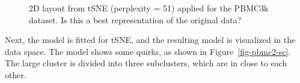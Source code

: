 \documentclass[
  12pt]{article}
\begin{document}
\begin{figure}[H]


\caption{\label{fig-tsnesuggest}2D layout from tSNE (perplexity = 51)
applied for the PBMC3k dataset. Is this a best representation of the
original data?}

\end{figure}%

Next, the model is fitted for tSNE, and the resulting model is
visualized in the data space. The model shows some quirks, as shown in
Figure~\ref{fig-pbmc2-sc}. The large cluster is divided into three
subclusters, which are in close to each other.
\end{document}
